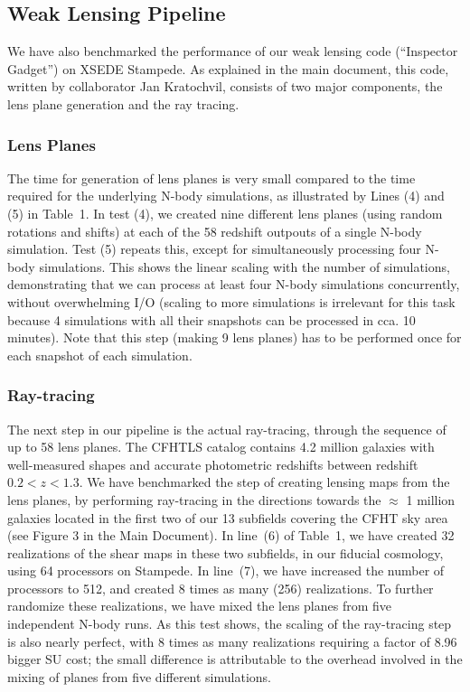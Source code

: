 \documentclass[10pt, preprint]{aastex}
\begin{document}
\subsection{Weak Lensing Pipeline}

We have also benchmarked the performance of our weak lensing code
(``Inspector Gadget'') on XSEDE Stampede. As explained in the main
document, this code, written by collaborator Jan Kratochvil, consists
of two major components, the lens plane generation and the ray
tracing.

\subsubsection{Lens Planes}

The time for generation of lens planes is very small compared to the
time required for the underlying N-body simulations, as illustrated by
Lines (4) and (5) in Table~1. In test (4), we created nine different
lens planes (using random rotations and shifts) at each of the 58
redshift outpouts of a single N-body simulation. Test (5) repeats
this, except for simultaneously processing four N-body
simulations. This shows the linear scaling with the number of
simulations, demonstrating that we can process at least four N-body
simulations concurrently, without overwhelming I/O (scaling to more
simulations is irrelevant for this task because 4 simulations with all
their snapshots can be processed in cca. 10 minutes).  Note that this
step (making 9 lens planes) has to be performed once for each snapshot
of each simulation.

\subsubsection{Ray-tracing}

The next step in our pipeline is the actual ray-tracing, through the
sequence of up to 58 lens planes.  The CFHTLS catalog contains 4.2
million galaxies with well-measured shapes and accurate photometric
redshifts between redshift $0.2 < z < 1.3$.  We have benchmarked the
step of creating lensing maps from the lens planes, by performing
ray-tracing in the directions towards the $\approx$ 1 million galaxies
located in the first two of our 13 subfields covering the CFHT sky
area (see Figure 3 in the Main Document).  In line~(6) of Table~1, we
have created 32 realizations of the shear maps in these two subfields,
in our fiducial cosmology, using 64 processors on Stampede.  In
line~(7), we have increased the number of processors to 512, and
created 8 times as many (256) realizations.  To further randomize
these realizations, we have mixed the lens planes from five
independent N-body runs.  As this test shows, the scaling of the
ray-tracing step is also nearly perfect, with 8 times as many
realizations requiring a factor of 8.96 bigger SU cost; the small
difference is attributable to the overhead involved in the mixing of
planes from five different simulations.
\end{document}
